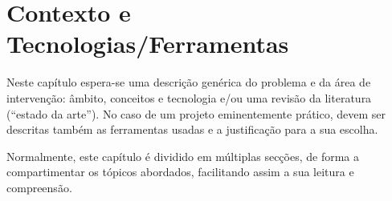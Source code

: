 \chapter{Contexto e Tecnologias/Ferramentas}\label{cap:conceptual}

Neste capítulo espera-se uma descrição genérica do problema e da área de intervenção: âmbito, conceitos e tecnologia e/ou uma revisão da literatura (``estado da arte''). No caso de um projeto eminentemente prático, devem ser descritas também as ferramentas usadas e a justificação para a sua escolha.

Normalmente, este capítulo é dividido em múltiplas secções, de forma a compartimentar os tópicos abordados, facilitando assim a sua leitura e compreensão.